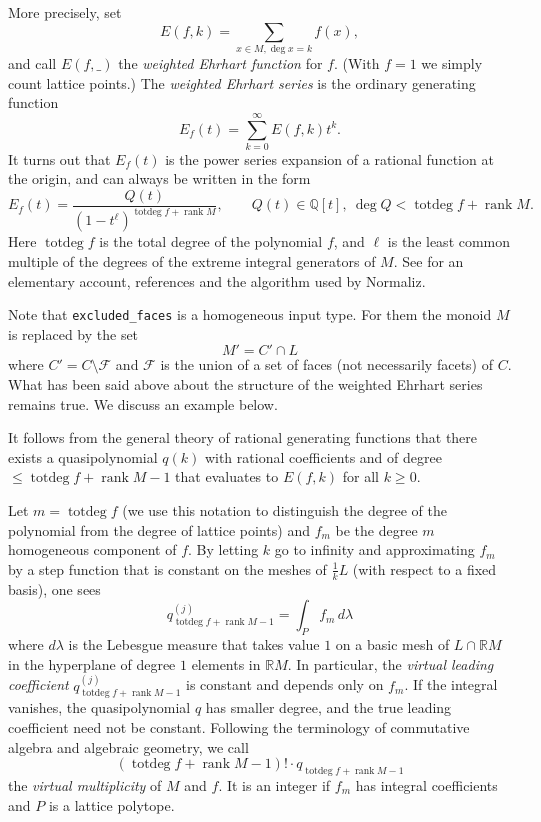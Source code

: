 \documentclass[12pt,a4paper]{scrartcl}
\theoremstyle{definition}
\def\QQ{{\mathbb Q}}
\def\RR{{\mathbb R}}
\DeclareMathOperator{\rank}{rank}
\DeclareMathOperator{\totdeg}{totdeg}
\begin{document}
{	More precisely, set
	$$
	E(f,k)=\sum_{x\in M, \deg x=k} f(x),
	$$
	and call $E(f,\_)$ the \emph{weighted Ehrhart function} for
	$f$. (With $f=1$ we simply count lattice points.) The
	\emph{weighted Ehrhart series} is the ordinary generating
	function
	$$
	E_f(t)=\sum_{k=0}^\infty E(f,k)t^k.
	$$
	It turns out that $E_f(t)$ is the power series expansion of a
	rational function at the origin, and can always be written in
	the form
	$$
	E_f(t)=\frac{Q(t)}{(1-t^\ell)^{\totdeg f+\rank M}},\qquad Q(t)\in\QQ[t],\
	\deg Q< \totdeg f+\rank M.
	$$
	Here $\totdeg f$ is the total degree of the polynomial $f$, and
	$\ell$ is the least common  multiple of the degrees of the
	extreme integral generators of $M$. See \cite{BS} for an
	elementary account, references and the algorithm used by Normaliz.
	
	Note that \verb|excluded_faces| is a homogeneous input type. For them the monoid $M$ is replaced by the set
	$$
	M'=C'\cap L
	$$
	where $C'=C\setminus \mathcal F$ and $\mathcal F$ is the union of a set of
	faces
	(not necessarily facets) of $C$. What has been said above about the structure
	of the weighted Ehrhart series remains true. We discuss an example below.
	
	It follows from the general theory of rational generating
	functions that there exists a quasipolynomial $q(k)$ with
	rational coefficients and of degree $\le \totdeg f+\rank M-1$ that
	evaluates to $E(f,k)$ for all $k\ge 0$.
	
	Let $m=\totdeg f$ (we use this notation to distinguish the degree of the polynomial from the degree of lattice points) and $f_m$ be the degree $m$ homogeneous
	component of $f$. By letting $k$ go to infinity and
	approximating $f_m$ by a step function that is constant on the
	meshes of $\frac 1kL$ (with respect to a fixed basis), one sees
	$$
	q^{(j)}_{\totdeg f+\rank M-1}=\int_P f_m\, d\lambda
	$$
	where $d\lambda$ is the Lebesgue measure that takes value $1$
	on a basic mesh of $L\cap \RR M$ in the hyperplane of degree
	$1$ elements in $\RR M$. In particular, the \emph{virtual
		leading coefficient} $q^{(j)}_{\totdeg f+\rank M-1}$ is
	constant and depends only on $f_m$. If the integral vanishes,
	the quasipolynomial $q$ has smaller degree, and the true
	leading coefficient need not be constant. Following the
	terminology of commutative algebra and algebraic geometry, we
	call
	$$
	(\totdeg f+\rank M-1)!\cdot q_{\totdeg f+\rank M-1}
	$$
	the \emph{virtual multiplicity} of $M$ and $f$. It is an
	integer if $f_m$ has integral coefficients and $P$ is a lattice
	polytope.
	
}
\end{document}
